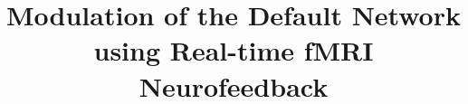 
\title{Modulation of the Default Network using Real-time fMRI Neurofeedback}


\author[addressref={aff1}]{ }
\author[addressref={aff1}]{ }
\author[addressref={aff2}]{ }
\author[addressref={aff3}]{ }
\author[addressref={aff3,aff4,aff5}]{ }
\author[addressref={aff6}]{ }
\author[addressref={aff1,aff7}]{ }
\author[addressref={aff3,aff8,aff9}]{ }
\author[addressref={aff1,aff7},
   email={ccraddock@nki.rfmh.org},
   corref={aff1,aff2}]{ }



